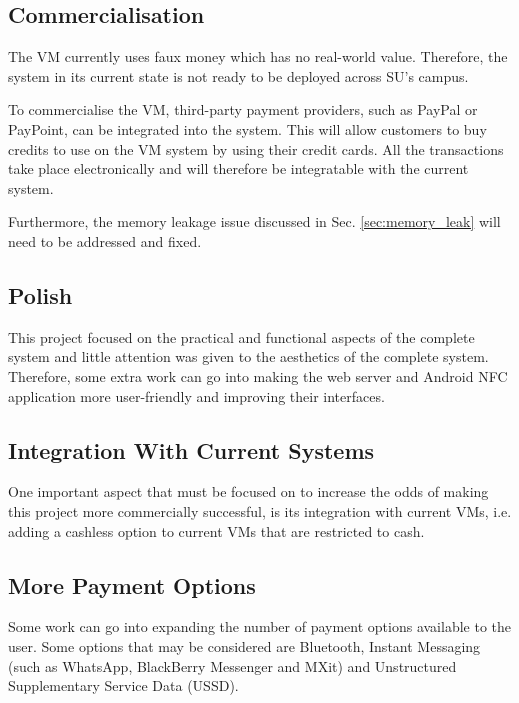 \subsection{Commercialisation}

The VM currently uses faux money which has no real-world value. Therefore,
the system in its current state is not ready to be deployed across SU's campus. 

To commercialise the VM, third-party payment providers, such
as PayPal or PayPoint, can be integrated into the system. This will allow customers to
buy credits to use on the VM system by using their credit cards. All the
transactions take place electronically and will therefore be integratable with
the current system.

Furthermore, the memory leakage issue discussed in Sec. \ref{sec:memory_leak} will need
to be addressed and fixed.

\subsection{Polish}

This project focused on the practical and functional aspects of the complete
system and little attention was given to the aesthetics of the complete system.
Therefore, some extra work can go into making the web server and Android NFC
application more user-friendly and improving their interfaces.

\subsection{Integration With Current Systems}

One important aspect that must be focused on to increase the odds of making this project
more commercially successful, is its integration with current VMs, i.e.
adding a cashless option to current VMs that are restricted to cash.

\subsection{More Payment Options}

Some work can go into expanding the number of payment options available to the user.
Some options that may be considered are Bluetooth, Instant Messaging (such as WhatsApp,
BlackBerry Messenger and MXit) and Unstructured Supplementary Service Data (USSD).